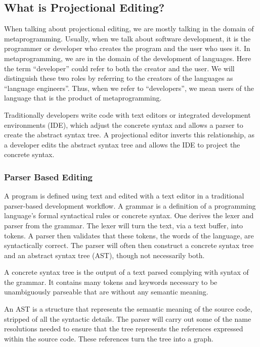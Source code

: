 \subsection{What is Projectional Editing?}
\label{section:WhatIsPE}

When talking about projectional editing, we are mostly talking in the domain of metaprogramming.
Usually, when we talk about software development, it is the programmer or developer who creates the program and the user who uses it. 
In metaprogramming, we are in the domain of the development of languages.
Here the term ``developer'' could refer to both the creator and the user.
We will distinguish these two roles by referring to the creators of the languages as ``language engineers''.
Thus, when we refer to ``developers'', we mean users of the language that is the product of metaprogramming. 

Traditionally developers write code with text editors or integrated development environments (IDE), which adjust the concrete syntax and allows a parser to create the abstract syntax tree.
A projectional editor inverts this relationship, as a developer edits the abstract syntax tree and allows the IDE to project the concrete syntax.

\subsubsection{Parser Based Editing}

A program is defined using text and edited with a text editor in a traditional parser-based development workflow.
A grammar is a definition of a programming language's formal syntactical rules or concrete syntax.
One derives the lexer and parser from the grammar.
The lexer will turn the text, via a text buffer, into tokens. 
A parser then validates that these tokens, the words of the language, are syntactically correct.
The parser will often then construct a concrete syntax tree and an abstract syntax tree (AST), though not necessarily both.

A concrete syntax tree is the output of a text parsed complying with syntax of the grammar.
It contains many tokens and keywords necessary to be unambiguously parseable that are without any semantic meaning.

An AST is a structure that represents the semantic meaning of the source code, stripped of all the syntactic details.
The parser will carry out some of the name resolutions needed to ensure that the tree represents the references expressed within the source code.
These references turn the tree into a graph.

